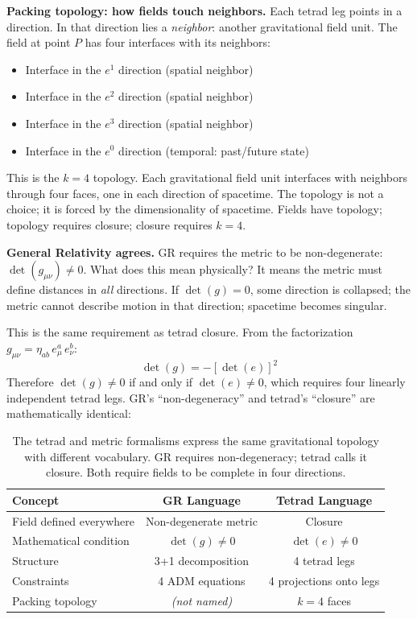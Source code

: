 \documentclass[aps,prd,preprint,superscriptaddress,showpacs,preprintnumbers,amsmath,amssymb,nofootinbib]{revtex4-2}
\begin{document}
\textbf{Packing topology: how fields touch neighbors.} Each tetrad leg points in a direction. In that direction lies a \emph{neighbor}: another gravitational field unit. The field at point $P$ has four interfaces with its neighbors:
\begin{itemize}
\item Interface in the $e^1$ direction (spatial neighbor)
\item Interface in the $e^2$ direction (spatial neighbor)
\item Interface in the $e^3$ direction (spatial neighbor)
\item Interface in the $e^0$ direction (temporal: past/future state)
\end{itemize}
This is the $k=4$ topology. Each gravitational field unit interfaces with neighbors through four faces, one in each direction of spacetime. The topology is not a choice; it is forced by the dimensionality of spacetime. Fields have topology; topology requires closure; closure requires $k=4$.

\textbf{General Relativity agrees.} GR requires the metric to be non-degenerate: $\det(g_{\mu\nu}) \neq 0$. What does this mean physically? It means the metric must define distances in \emph{all} directions. If $\det(g) = 0$, some direction is collapsed; the metric cannot describe motion in that direction; spacetime becomes singular.

This is the same requirement as tetrad closure. From the factorization $g_{\mu\nu} = \eta_{ab}\, e^a_\mu\, e^b_\nu$:
\begin{equation}
\det(g) = -[\det(e)]^2
\end{equation}
Therefore $\det(g) \neq 0$ if and only if $\det(e) \neq 0$, which requires four linearly independent tetrad legs. GR's ``non-degeneracy'' and tetrad's ``closure'' are mathematically identical:

\begin{table}[H]
\centering
\begin{tabular*}{\textwidth}{@{\extracolsep{\fill}} lcc @{}}
\toprule
\textbf{Concept} & \textbf{GR Language} & \textbf{Tetrad Language} \\
\midrule
Field defined everywhere & Non-degenerate metric & Closure \\
Mathematical condition & $\det(g) \neq 0$ & $\det(e) \neq 0$ \\
Structure & 3+1 decomposition & 4 tetrad legs \\
Constraints & 4 ADM equations & 4 projections onto legs \\
Packing topology & \emph{(not named)} & $k=4$ faces \\
\bottomrule
\end{tabular*}
\caption{The tetrad and metric formalisms express the same gravitational topology with different vocabulary. GR requires non-degeneracy; tetrad calls it closure. Both require fields to be complete in four directions.}
\label{tab:closure}
\end{table}
\end{document}
